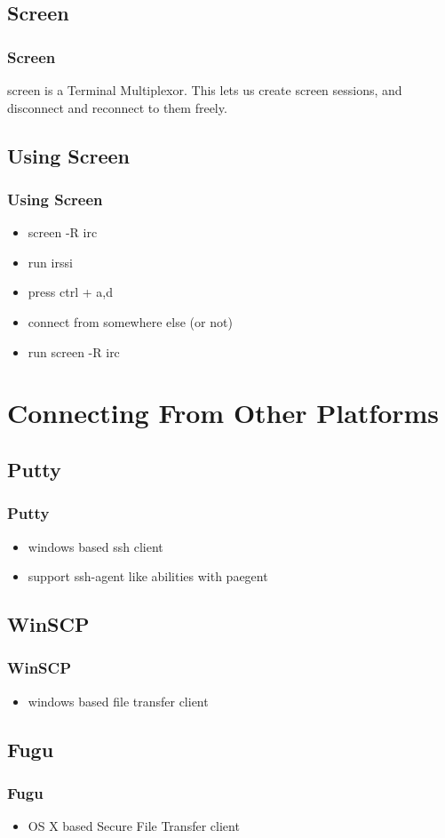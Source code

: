 \documentclass[hyperref={pdfpagelabels=false}]{beamer}
\begin{document}
\subsection{Screen}
\frame
{
  \frametitle{Screen}
  screen is a Terminal Multiplexor.
  This lets us create screen sessions, and disconnect and reconnect to them freely.
}
\subsection{Using Screen}
\frame
{
  \frametitle{Using Screen}
  \begin{itemize}
  \item{screen -R irc}
  \item{run irssi}
  \item{press ctrl + a,d}
  \item{connect from somewhere else (or not)}
  \item{run screen -R irc}
  \end{itemize}
}

\section{Connecting From Other Platforms}
\subsection{Putty}
\frame
{
    \frametitle{Putty}
    \begin{itemize}
    \item{windows based ssh client}
    \item{support ssh-agent like abilities with paegent}
    \end{itemize}
}
\subsection{WinSCP}
\frame
{
    \frametitle{WinSCP}
    \begin{itemize}
    \item{windows based file transfer client}
    \end{itemize}
}
\subsection{Fugu}
\frame
{
    \frametitle{Fugu}
    \begin{itemize}
    \item{OS X based Secure File Transfer client}
    \end{itemize}
}
\end{document}
